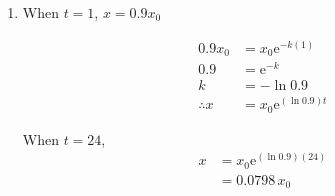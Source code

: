 \documentclass[11pt,a4paper]{book}
\begin{document}
\begin{example}
\begin{enumerate}[label=(\alph*)]
\item 
\begin{minipage}[t]{.4\textwidth}

When $t=1$, $x=0.9x_{0}$

\begin{align*}
0.9x_{0} & =x_{0}\mathrm{e}^{-k\left(1\right)}\\
0.9 & =\mathrm{e}^{-k}\\
k & =-\ln0.9\\
\therefore x& =x_{0}\mathrm{e}^{\left(\ln0.9\right)t}
\end{align*}


\end{minipage}
\begin{minipage}[t]{.4\textwidth}

When $t=24$,
\begin{align*}
x & =x_{0}\mathrm{e}^{\left(\ln0.9\right)\left(24\right)}\\
 & =0.0798\,x_{0}
\end{align*}

\end{minipage}
\end{enumerate}
\end{example}

\newpage
\end{document}
